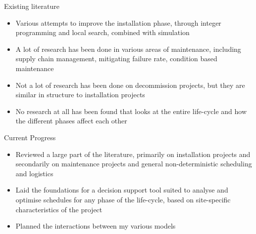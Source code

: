 \documentclass{beamer}
\begin{document}
\begin{frame}{Existing literature}
   \begin{itemize}
  	\item Various attempts to improve the installation phase, through integer programming and local search, combined with simulation
  	\item A lot of research has been done in various areas of maintenance, including supply chain management, mitigating failure rate, condition based maintenance
  	\item Not a lot of research has been done on decommission projects, but they are similar in structure to installation projects
  	\item No research at all has been found that looks at the entire life-cycle and how the different phases affect each other
  \end{itemize}
\end{frame}


\begin{frame}{Current Progress}
   \begin{itemize}
  	\item Reviewed a large part of the literature, primarily on installation projects and secondarily on maintenance projects and general non-deterministic scheduling and logistics
  	\item Laid the foundations for a decision support tool suited to analyse and optimise schedules for any phase of the life-cycle, based on site-specific characteristics of the project
  	\item Planned the interactions between my various models	
  \end{itemize}
\end{frame}
\end{document}
